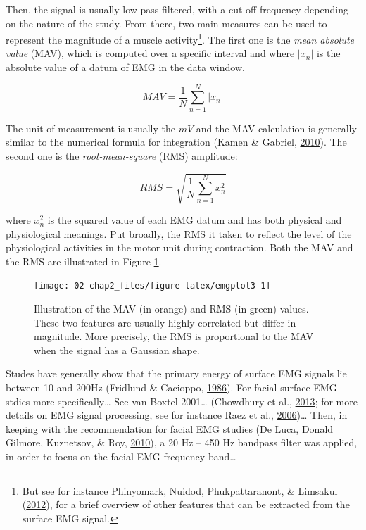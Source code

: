 \documentclass[a4paper,12pt,twoside,openright,oldfontcommands]{memoir}
\let\rmarkdownfootnote\footnote%
\def\footnote{\protect\rmarkdownfootnote}
\begin{document}
Then, the signal is usually low-pass filtered, with a cut-off frequency
depending on the nature of the study. From there, two main measures can
be used to represent the magnitude of a muscle activity\footnote{But see
  for instance Phinyomark, Nuidod, Phukpattaranont, \& Limsakul
  (\protect\hyperlink{ref-phinyomark_feature_2012}{2012}), for a brief
  overview of other features that can be extracted from the surface EMG
  signal.}. The first one is the \emph{mean absolute value} (MAV), which
is computed over a specific interval and where \(|x_{n}|\) is the
absolute value of a datum of EMG in the data window.

\[MAV = \frac{1}{N} \sum_{n=1}^{N} | x_{n} |\]

The unit of measurement is usually the \(mV\) and the MAV calculation is
generally similar to the numerical formula for integration (Kamen \&
Gabriel, \protect\hyperlink{ref-kamen_essentials_2010}{2010}). The
second one is the \emph{root-mean-square} (RMS) amplitude:

\[RMS = \sqrt{ \frac{1}{N} \sum_{n=1}^{N} x^{2}_{n} }\]

where \(x^{2}_{n}\) is the squared value of each EMG datum and has both
physical and physiological meanings. Put broadly, the RMS it taken to
reflect the level of the physiological activities in the motor unit
during contraction. Both the MAV and the RMS are illustrated in Figure
\ref{fig:emgplot3}.

\begin{figure}[H]

{\centering \texttt{[image: 02-chap2\_files/figure-latex/emgplot3-1]} 

}

\caption{Illustration of the MAV (in orange) and RMS (in green) values. These two features are usually highly correlated but differ in magnitude. More precisely, the RMS is proportional to the MAV when the signal has a Gaussian shape.}\label{fig:emgplot3}
\end{figure}

Studes have generally show that the primary energy of surface EMG
signals lie between 10 and 200Hz (Fridlund \& Cacioppo,
\protect\hyperlink{ref-fridlund_guidelines_1986}{1986}). For facial
surface EMG stdies more specifically\ldots{} See van Boxtel 2001\ldots{}
(Chowdhury et al., \protect\hyperlink{ref-chowdhury_surface_2013}{2013};
for more details on EMG signal processing, see for instance Raez et al.,
\protect\hyperlink{ref-raez_techniques_2006}{2006})\ldots{} Then, in
keeping with the recommendation for facial EMG studies (De Luca, Donald
Gilmore, Kuznetsov, \& Roy,
\protect\hyperlink{ref-de_luca_filtering_2010}{2010}), a 20 Hz -- 450 Hz
bandpass filter was applied, in order to focus on the facial EMG
frequency band\ldots{}
\end{document}
